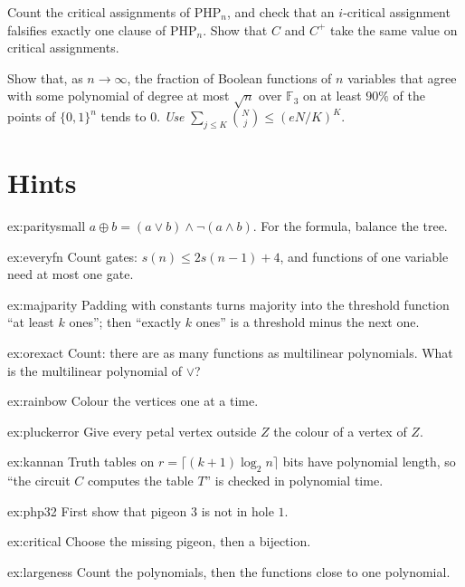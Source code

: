 \begin{exercise}[$\star$]\label{ex:critical}
Count the critical assignments of $\mathrm{PHP}_n$, and check that an $i$-critical assignment falsifies exactly one clause of $\mathrm{PHP}_n$. Show that $C$ and $C^+$ take the same value on critical assignments.
\end{exercise}

\begin{exercise}[$\star\star$]\label{ex:largeness}
Show that, as $n\to\infty$, the fraction of Boolean functions of $n$ variables that agree with some polynomial of degree at most $\sqrt n$ over $\mathbb F_3$ on at least $90\%$ of the points of $\{0,1\}^n$ tends to $0$. \emph{Use} $\sum_{j\le K}\binom Nj\le(eN/K)^K$.
\end{exercise}

\section{Hints}

\begin{hint}{ex:paritysmall}
$a\oplus b=(a\lor b)\land\lnot(a\land b)$. For the formula, balance the tree.
\end{hint}
\begin{hint}{ex:everyfn}
Count gates: $s(n)\le2s(n-1)+4$, and functions of one variable need at most one gate.
\end{hint}
\begin{hint}{ex:majparity}
Padding with constants turns majority into the threshold function ``at least $k$ ones''; then ``exactly $k$ ones'' is a threshold minus the next one.
\end{hint}
\begin{hint}{ex:orexact}
Count: there are as many functions as multilinear polynomials. What is the multilinear polynomial of $\lor$?
\end{hint}
\begin{hint}{ex:rainbow}
Colour the vertices one at a time.
\end{hint}
\begin{hint}{ex:pluckerror}
Give every petal vertex outside $Z$ the colour of a vertex of $Z$.
\end{hint}
\begin{hint}{ex:kannan}
Truth tables on $r=\lceil(k+1)\log_2n\rceil$ bits have polynomial length, so ``the circuit $C$ computes the table $T$'' is checked in polynomial time.
\end{hint}
\begin{hint}{ex:php32}
First show that pigeon $3$ is not in hole $1$.
\end{hint}
\begin{hint}{ex:critical}
Choose the missing pigeon, then a bijection.
\end{hint}
\begin{hint}{ex:largeness}
Count the polynomials, then the functions close to one polynomial.
\end{hint}

